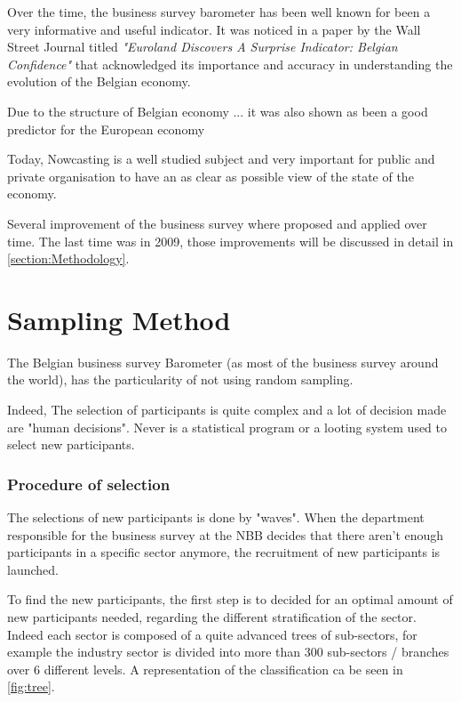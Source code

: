 \documentclass[12pt,a4paper,oneside]{book}
\begin{document}
Over the time, the business survey barometer has been well known for been a very informative and useful indicator. 
It was noticed in a paper by the Wall Street Journal titled \textit{"Euroland Discovers A Surprise Indicator: Belgian Confidence"} \citep{rhoads_euroland_1999} that acknowledged its importance and accuracy in understanding the evolution of the Belgian economy.


Due to the structure of Belgian economy ... it was also shown as been a good predictor for the European economy \cite{vanhaelen_belgian_2000}

Today, Nowcasting is a well studied subject and very important for public and private organisation to have an as clear as possible view of the state of the economy.

Several improvement of the business survey where proposed and applied over time. The last time was in 2009, those improvements will be discussed in detail in \autoref{section:Methodology}.


\section{Sampling Method}
\label{sec:Recruitment of participants}

The Belgian business survey Barometer (as most of the business survey around the world), has the particularity of not using random sampling.

Indeed, The selection of participants is quite complex and a lot of decision made are "human decisions". Never is a statistical program or a looting system used to select new participants.

\subsubsection{Procedure of selection}

The selections of new participants is done by "waves". When the department responsible for the business survey at the NBB decides that there aren't enough participants in a specific sector anymore, the recruitment of new participants is launched. 

To find the new participants, the first step is to decided for an optimal amount of new participants needed, regarding the different stratification of the sector.
Indeed each sector is composed of a quite advanced trees of sub-sectors, for example the industry sector is divided into more than 300 sub-sectors / branches over 6 different levels. A representation of the classification ca be seen in \autoref{fig:tree}.
\end{document}
